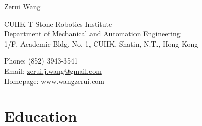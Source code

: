 \documentclass[10pt,letterpaper]{article}
\def\name{Zerui Wang}
\begin{document}
{\huge \name}


\bigskip

\begin{minipage}[t]{0.595\textwidth}
  CUHK T Stone Robotics Institute \\
  Department of Mechanical and Automation Engineering \\
  1/F, Academic Bldg. No. 1, CUHK, Shatin, N.T., Hong Kong
\end{minipage}
\begin{minipage}[t]{0.395\textwidth}
  Phone: (852) 3943-3541 \\
  Email: \href{mailto:zerui.j.wang@gmail.com}{zerui.j.wang@gmail.com} \\
  Homepage: \href{http://www.wangzerui.com/}{www.wangzerui.com}
\end{minipage}

\section*{Education}
\end{document}
